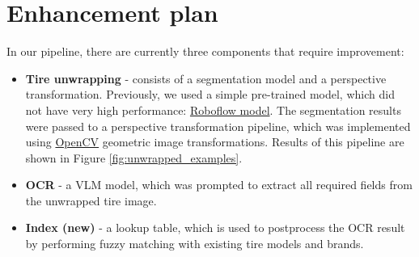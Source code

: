 \documentclass{article}
\begin{document}
\section{Enhancement plan}

In our pipeline, there are currently three components that require improvement:

\begin{itemize}
    \item \textbf{Tire unwrapping} - consists of a segmentation model and a perspective transformation. Previously, we used a simple pre-trained model, which did not have very high performance: \href{https://universe.roboflow.com/my-workspace-xwpro/tire-segmentation-eqoeu}{Roboflow model}. The segmentation results were passed to a perspective transformation pipeline, which was implemented using \href{https://docs.opencv.org/4.x/da/d54/group__imgproc__transform.html}{OpenCV} geometric image transformations. Results of this pipeline are shown in Figure \ref{fig:unwrapped_examples}.
    \item \textbf{OCR} - a VLM model, which was prompted to extract all required fields from the unwrapped tire image.
    \item \textbf{Index (new)} - a lookup table, which is used to postprocess the OCR result by performing fuzzy matching with existing tire models and brands.
\end{itemize}
\end{document}
